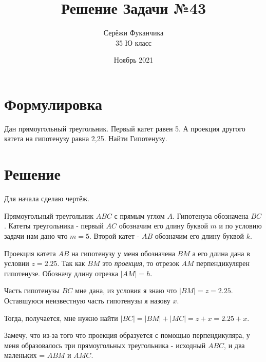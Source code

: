 \documentclass{article}
\title{Решение Задачи №43}
\author{Серёжи Фуканчика\\35 Ю класс}
\date{Ноябрь 2021}
\begin{document}
\maketitle

\section{Формулировка}
Дан прямоугольный треугольник. Первый катет равен 5. А проекция другого катета на гипотенузу равна 2,25. Найти Гипотенузу.

\section{Решение}
Для начала сделаю чертёж.


Прямоугольный треугольник $ABC$ с прямым углом $A$. Гипотенуза обозначена $BC$. Катеты треугольника - первый $AC$ обозначим его длину буквой $m$ и по условию задачи нам дано что $m=5$. Второй катет - $AB$ обозначим его длину буквой $k$.

Проекция катета $AB$  на гипотенузу у меня обозначена $BM$ а его длина дана в условии $z=2.25$. Так как $BM$ это \textit{проекция}, то отрезок $AM$ перпендикулярен гипотенузе. Обозначу длину отрезка $|AM|=h$.

Часть гипотенузы $BC$ мне дана, из условия я знаю что $|BM|=z=2.25$. Оставшуюся неизвестную часть гипотенузы я назову $x$.

Тогда, получается, мне нужно найти $|BC|=|BM|+|MC|=z+x=2.25+x$.

Замечу, что из-за того что проекция образуется с помощью перпендикуляра, у меня образовалось три прямоугольных треугольника -  исходный $ABC$, и два маленьких = $ABM$ и $AMC$.
\end{document}
